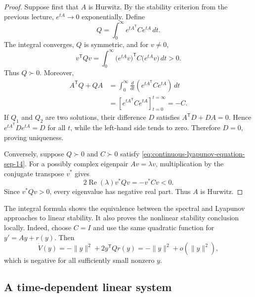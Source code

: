 \begin{proof}
  Suppose first that \(A\) is Hurwitz. By the stability criterion from
  the previous lecture, \(e^{tA}\to0\) exponentially. Define
  \begin{equation}\label{eq:lyapunov-integral-solution-sep-14}
    Q=\int_0^\infty e^{tA^{\mathsf T}}Ce^{tA}\,dt.
  \end{equation}
  The integral converges, \(Q\) is symmetric, and for \(v\neq0\),
  \[
    v^{\mathsf T}Qv
    =\int_0^\infty
      \bigl(e^{tA}v\bigr)^{\mathsf T}C
      \bigl(e^{tA}v\bigr)\,dt>0.
  \]
  Thus \(Q\succ0\). Moreover,
  \begin{align*}
    A^{\mathsf T}Q+QA
    &=\int_0^\infty
      \frac{d}{dt}
      \left(e^{tA^{\mathsf T}}Ce^{tA}\right)\,dt\\
    &=\left[e^{tA^{\mathsf T}}Ce^{tA}\right]_{t=0}^{t=\infty}
      =-C.
  \end{align*}
  If \(Q_1\) and \(Q_2\) are two solutions, their difference \(D\)
  satisfies \(A^{\mathsf T}D+DA=0\). Hence
  \(e^{tA^{\mathsf T}}De^{tA}=D\) for all \(t\), while the left-hand
  side tends to zero. Therefore \(D=0\), proving uniqueness.

  Conversely, suppose \(Q\succ0\) and \(C\succ0\) satisfy
  \eqref{eq:continuous-lyapunov-equation-sep-14}. For a possibly complex
  eigenpair \(Av=\lambda v\), multiplication by the conjugate transpose
  \(v^*\) gives
  \[
    2\operatorname{Re}(\lambda)v^*Qv=-v^*Cv<0.
  \]
  Since \(v^*Qv>0\), every eigenvalue has negative real part. Thus
  \(A\) is Hurwitz.
\end{proof}

The integral formula shows the equivalence between the spectral and
Lyapunov approaches to linear stability. It also proves the nonlinear
stability conclusion locally. Indeed, choose \(C=I\) and use the same
quadratic function for
\(y'=Ay+r(y)\). Then
\[
  \dot V(y)
  =-\lVert y\rVert^2+2y^{\mathsf T}Qr(y)
  =-\lVert y\rVert^2+o(\lVert y\rVert^2),
\]
which is negative for all sufficiently small nonzero \(y\).

\subsection{A time-dependent linear system}

